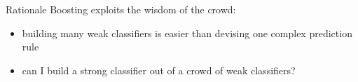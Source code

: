 \begin{frame}{Rationale}
Boosting exploits the wisdom of the crowd:
\begin{itemize}
\item building many weak classifiers is easier than devising one complex prediction rule
\item can I build a strong classifier out of a crowd of weak classifiers?
\end{itemize}
\end{frame}
